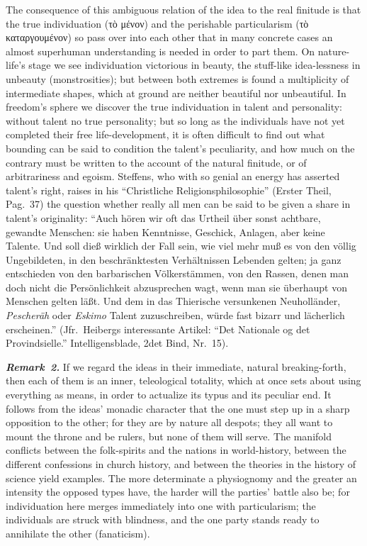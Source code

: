 \documentclass[12pt]{book}
\newcommand{\anm}[1]{\emph{\textbf{Remark~#1.}}}
\begin{document}
The consequence of this ambiguous relation of the idea to the real finitude
is that the true individuation (τὸ μένον) and the perishable particularism
(τὸ καταργουμένον) so pass over into each other that in many concrete cases
an almost superhuman understanding is needed in order to part them. On
nature-life's stage we see individuation victorious in beauty, the
stuff-like idea-lessness in unbeauty (monstrosities); but between both
extremes is found a multiplicity of intermediate shapes, which at ground are
neither beautiful nor unbeautiful. In freedom's sphere we discover the true
individuation in talent and personality: without talent no true personality;
but so long as the individuals have not yet completed their free
life-development, it is often difficult to find out what bounding can be
said to condition the talent's peculiarity, and how much on the contrary
must be written to the account of the natural finitude, or of arbitrariness
and egoism. Steffens, who with so genial an energy has asserted talent's
right, raises in his ``Christliche Religionsphilosophie'' (Erster Theil,
Pag.\ 37) the question whether really all men can be said to be given a
share in talent's originality: ``Auch hören wir oft das Urtheil über sonst
achtbare, gewandte Menschen: sie haben Kenntnisse, Geschick, Anlagen, aber
keine Talente. Und soll dieß wirklich der Fall sein, wie viel mehr muß es
von den völlig Ungebildeten, in den beschränktesten Verhältnissen Lebenden
gelten; ja ganz entschieden von den barbarischen Völkerstämmen, von den
Rassen, denen man doch nicht die Persönlichkeit abzusprechen wagt, wenn man
sie überhaupt von Menschen gelten läßt. Und dem in das Thierische
versunkenen Neuholländer, \emph{Pescheräh} oder \emph{Eskimo} Talent
zuzuschreiben, würde fast bizarr und lächerlich erscheinen.'' (Jfr.\
Heibergs interessante Artikel: ``Det Nationale og det Provindsielle.''
Intelligensblade, 2det Bind, Nr.\ 15).

\anm{2} If we regard the ideas in their immediate, natural breaking-forth,
then each of them is an inner, teleological totality, which at once sets
about using everything as means, in order to actualize its typus and its
peculiar end. It follows from the ideas' monadic character that the one must
step up in a sharp opposition to the other; for they are by nature all
despots; they all want to mount the throne and be rulers, but none of them
will serve. The manifold conflicts between the folk-spirits and the nations
in world-history, between the different confessions in church history, and
between the theories in the history of science yield examples. The more
determinate a physiognomy and the greater an intensity the opposed types
have, the harder will the parties' battle also be; for individuation here
merges immediately into one with particularism; the individuals are struck
with blindness, and the one party stands ready to annihilate the other
(fanaticism).
\end{document}
